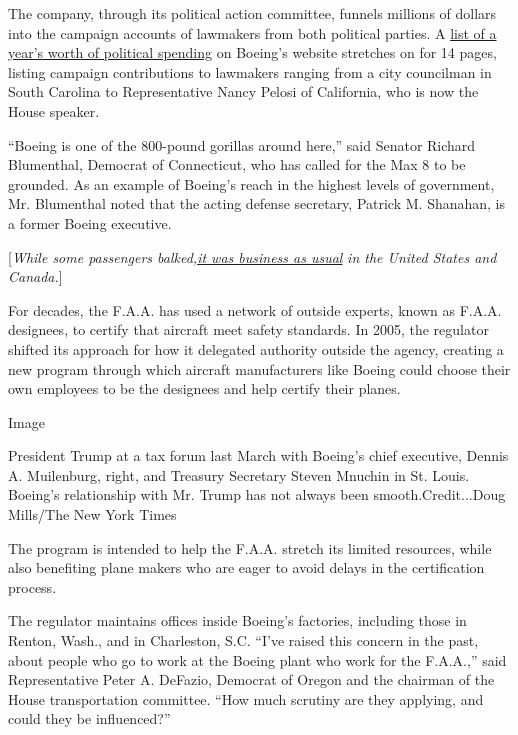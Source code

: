 The company, through its political action committee, funnels millions of
dollars into the campaign accounts of lawmakers from both political
parties. A
\href{http://www.boeing.com/resources/boeingdotcom/company/key_orgs/pdf/2015_BPAC_Pol_Expenditures.pdf}{list
of a year's worth of political spending} on Boeing's website stretches
on for 14 pages, listing campaign contributions to lawmakers ranging
from a city councilman in South Carolina to Representative Nancy Pelosi
of California, who is now the House speaker.

``Boeing is one of the 800-pound gorillas around here,'' said Senator
Richard Blumenthal, Democrat of Connecticut, who has called for the Max
8 to be grounded. As an example of Boeing's reach in the highest levels
of government, Mr. Blumenthal noted that the acting defense secretary,
Patrick M. Shanahan, is a former Boeing executive.

{[}\emph{While some passengers
balked,}\href{https://www.nytimes.com/2019/03/12/travel/grounded-planes-airline-passengers.html}{\emph{it
was business as usual}} \emph{in the United States and Canada.}{]}

For decades, the F.A.A. has used a network of outside experts, known as
F.A.A. designees, to certify that aircraft meet safety standards. In
2005, the regulator shifted its approach for how it delegated authority
outside the agency, creating a new program through which aircraft
manufacturers like Boeing could choose their own employees to be the
designees and help certify their planes.

Image

President Trump at a tax forum last March with Boeing's chief executive,
Dennis A. Muilenburg, right, and Treasury Secretary Steven Mnuchin in
St. Louis. Boeing's relationship with Mr. Trump has not always been
smooth.Credit...Doug Mills/The New York Times

The program is intended to help the F.A.A. stretch its limited
resources, while also benefiting plane makers who are eager to avoid
delays in the certification process.

The regulator maintains offices inside Boeing's factories, including
those in Renton, Wash., and in Charleston, S.C. ``I've raised this
concern in the past, about people who go to work at the Boeing plant who
work for the F.A.A.,'' said Representative Peter A. DeFazio, Democrat of
Oregon and the chairman of the House transportation committee. ``How
much scrutiny are they applying, and could they be influenced?''

